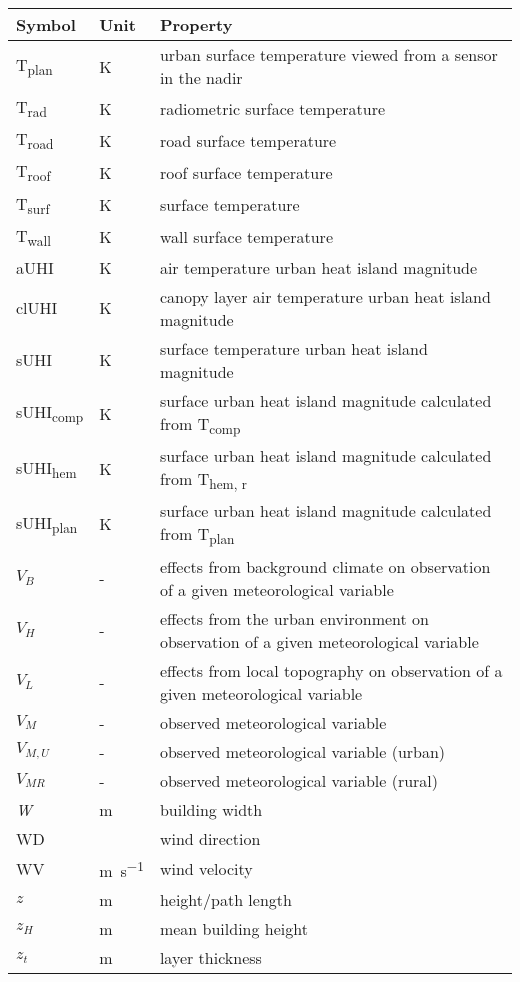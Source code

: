 \begin{table}[H]
	\centering
	\begin{tabular}{p{1.5cm}p{3cm}p{10cm}}
		\toprule
		Symbol & Unit & Property \\
		\midrule
		T\textsubscript{plan} & \si{\kelvin} & urban surface temperature viewed from a sensor in the nadir\\
		T\textsubscript{rad} & \si{\kelvin} & radiometric surface temperature\\
		T\textsubscript{road} & \si{\kelvin} & road surface temperature\\
		T\textsubscript{roof} & \si{\kelvin} & roof surface temperature \\
		T\textsubscript{surf} & \si{\kelvin} & surface temperature \\
		T\textsubscript{wall} & \si{\kelvin} & wall surface temperature\\
		aUHI & \si{\kelvin} & air temperature urban heat island magnitude \\
		clUHI & \si{\kelvin} & canopy layer air temperature urban heat island magnitude \\
		sUHI & \si{\kelvin} & surface temperature urban heat island magnitude \\
		sUHI\textsubscript{comp}  & \si{\kelvin} & surface urban heat island magnitude calculated from T\textsubscript{comp} \\
		sUHI\textsubscript{hem}  & \si{\kelvin} & surface urban heat island magnitude calculated from T\textsubscript{hem, r} \\
		sUHI\textsubscript{plan}  & \si{\kelvin} & surface urban heat island magnitude calculated from T\textsubscript{plan} \\
		$V_B$ & - & effects from background climate on observation of a given meteorological variable \\
		$V_H$ & - & effects from the urban environment on observation of a given meteorological variable \\
		$V_L$ & - & effects from local topography on observation of a given meteorological variable \\
		$V_M$ & - & observed meteorological variable \\
		$V_{M, U} $ & - & observed meteorological variable (urban) \\
		$V_{M  R}$ & - & observed meteorological variable (rural) \\
		\textit{W} & \si{\meter} & building width \\
		WD & \si{\deg} & wind direction \\
		WV & \si{\meter\per\second} & wind velocity \\
		$z$ & \si{\meter} & height/path length \\
		$z_H$ & \si{\meter} & mean building height \\
		$z_t$ & \si{\meter} & layer thickness\\
		\bottomrule
	\end{tabular} 
\end{table}

